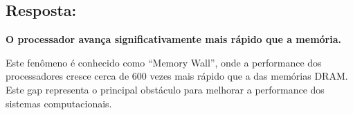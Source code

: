 \documentclass[12pt,a4paper]{article}
\begin{document}
\subsection*{Resposta:}

\textbf{O processador avança significativamente mais rápido que a memória.} 

Este fenômeno é conhecido como ``Memory Wall'', onde a performance dos processadores cresce cerca de 600 vezes mais rápido que a das memórias DRAM. Este gap representa o principal obstáculo para melhorar a performance dos sistemas computacionais.
\end{document}
